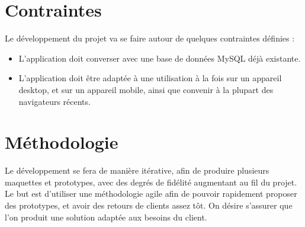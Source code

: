 \section{Contraintes}

	Le développement du projet va se faire autour de quelques contraintes définies :
	\begin{itemize}
		\item L’application doit converser avec une base de données MySQL déjà existante.
		\item L’application doit être adaptée à une utilisation à la fois sur un appareil desktop, et sur un appareil mobile, ainsi que convenir à la plupart des navigateurs récents.
	\end{itemize}

\section{Méthodologie}

	Le développement se fera de manière itérative, afin de produire plusieurs maquettes et prototypes, avec des degrés de fidélité augmentant au fil du projet. 
	Le but est d'utiliser une méthodologie agile afin de pouvoir rapidement proposer des
	prototypes, et avoir des retours de clients assez tôt. On désire s'assurer que l'on produit une solution adaptée aux besoins du client.